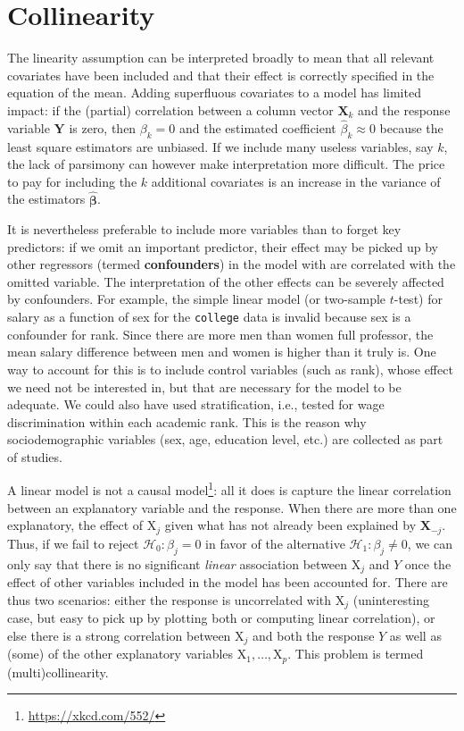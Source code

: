 \documentclass[
  11pt,
  letterpaper,
]{book}
\renewcommand{\href}[2]{#2\footnote{\url{#1}}}
\theoremstyle{definition}
\theoremstyle{definition}
\theoremstyle{definition}
\theoremstyle{definition}
\theoremstyle{remark}
\begin{document}
\hypertarget{collinearity}{%
\section{Collinearity}\label{collinearity}}

The linearity assumption can be interpreted broadly to mean that all relevant covariates have been included and that their effect is correctly specified in the equation of the mean. Adding superfluous covariates to a model has limited impact: if the (partial) correlation between a column vector \(\mathbf{X}_k\) and the response variable \(\boldsymbol{Y}\) is zero, then \(\beta_k=0\) and the estimated coefficient \(\widehat{\beta}_k \approx 0\) because the least square estimators are unbiased. If we include many useless variables, say \(k\), the lack of parsimony can however make interpretation more difficult. The price to pay for including the \(k\) additional covariates is an increase in the variance of the estimators \(\widehat{\boldsymbol{\beta}}\).

It is nevertheless preferable to include more variables than to forget key predictors: if we omit an important predictor, their effect may be picked up by other regressors (termed \textbf{confounders}) in the model with are correlated with the omitted variable. The interpretation of the other effects can be severely affected by confounders. For example, the simple linear model (or two-sample \(t\)-test) for salary as a function of sex for the \texttt{college} data is invalid because sex is a confounder for rank. Since there are more men than women full professor, the mean salary difference between men and women is higher than it truly is. One way to account for this is to include control variables (such as rank), whose effect we need not be interested in, but that are necessary for the model to be adequate. We could also have used stratification, i.e., tested for wage discrimination within each academic rank. This is the reason why sociodemographic variables (sex, age, education level, etc.) are collected as part of studies.

A linear model is not a \href{https://xkcd.com/552/}{causal model}: all it does is capture the linear correlation between an explanatory variable and the response. When there are more than one explanatory, the effect of \(\mathrm{X}_j\) given what has not already been explained by \(\mathbf{X}_{-j}\). Thus, if we fail to reject \(\mathscr{H}_0:\beta_j=0\) in favor of the alternative \(\mathscr{H}_1: \beta_j \neq 0\), we can only say that there is no significant \emph{linear} association between \(\mathrm{X}_j\) and \(Y\) once the effect of other variables included in the model has been accounted for. There are thus two scenarios: either the response is uncorrelated with \(\mathrm{X}_j\) (uninteresting case, but easy to pick up by plotting both or computing linear correlation), or else there is a strong correlation between \(\mathrm{X}_j\) and both the response \(Y\) as well as (some) of the other explanatory variables \(\mathrm{X}_1, \ldots, \mathrm{X}_p\). This problem is termed (multi)collinearity.
\end{document}

